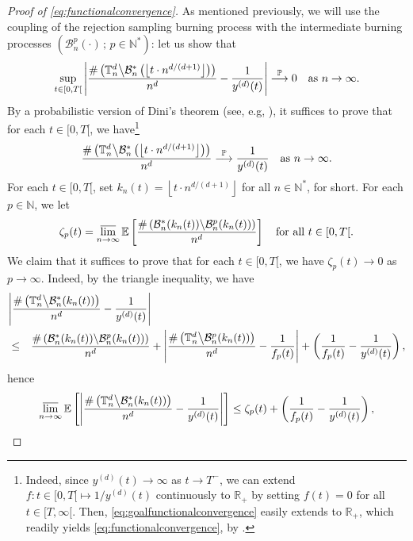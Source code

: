 \documentclass[a4paper,11pt]{article}
\begin{document}
\begin{proof}[Proof of \eqref{eq:functionalconvergence}]
As mentioned previously, we will use the coupling of the rejection sampling burning process with the intermediate burning processes $\left(\mathcal{B}_n^p(\cdot)\,;\,p\in\mathbb{N}^*\right)$: let us show that
\[\sup_{t\in[0,T[}\left|\frac{\#\left(\mathbb{T}_n^d\middle\backslash\mathcal{B}_n^*\left(\left\lfloor t\cdot n^{d/(d+1)}\right\rfloor\right)\right)}{n^d}-\frac{1}{y^{(d)}(t)}\right|\overset{\mathbb{P}}{\longrightarrow}0\quad\text{as $n\to\infty$.}\]
By a probabilistic version of Dini's theorem (see, e.g, \cite[Lemma 11.6]{chef}), it suffices to prove that for each $t\in[0,T[$, we have\footnote{Indeed, since $y^{(d)}(t)\rightarrow\infty$ as $t\to T^-$, we can extend $f:t\in{[0,T[}\mapsto1/y^{(d)}(t)$ continuously to $\mathbb{R}_+$ by setting $f(t)=0$ for all $t\in[T,\infty[$.
Then, \eqref{eq:goalfunctionalconvergence} easily extends to $\mathbb{R}_+$, which readily yields \eqref{eq:functionalconvergence}, by \cite[Lemma 11.6]{chef}.}
\begin{equation}\label{eq:goalfunctionalconvergence}
\frac{\#\left(\mathbb{T}_n^d\middle\backslash\mathcal{B}_n^*\left(\left\lfloor t\cdot n^{d/(d+1)}\right\rfloor\right)\right)}{n^d}\overset{\mathbb{P}}{\longrightarrow}\frac{1}{y^{(d)}(t)}\quad\text{as $n\to\infty$.}
\end{equation}
For each $t\in[0,T[$, set $k_n(t)=\left\lfloor t\cdot n^{d/(d+1)}\right\rfloor$ for all $n\in\mathbb{N}^*$, for short.
For each $p\in\mathbb{N}$, we let
\[\zeta_p(t)=\varlimsup_{n\to\infty}\mathbb{E}\left[\frac{\#\left(\mathcal{B}_n^*(k_n(t))\middle\backslash\mathcal{B}_n^p(k_n(t))\right)}{n^d}\right]\quad\text{for all $t\in[0,T[$.}\]
We claim that it suffices to prove that for each $t\in[0,T[$, we have $\zeta_p(t)\rightarrow0$ as $p\to\infty$.
Indeed, by the triangle inequality, we have
\begin{eqnarray*}
\lefteqn{\left|\frac{\#\left(\mathbb{T}_n^d\middle\backslash\mathcal{B}_n^*(k_n(t))\right)}{n^d}-\frac{1}{y^{(d)}(t)}\right|}\\
&\leq&\frac{\#\left(\mathcal{B}_n^*(k_n(t))\middle\backslash\mathcal{B}_n^p(k_n(t))\right)}{n^d}+\left|\frac{\#\left(\mathbb{T}_n^d\middle\backslash\mathcal{B}_n^p(k_n(t))\right)}{n^d}-\frac{1}{f_p(t)}\right|+\left(\frac{1}{f_p(t)}-\frac{1}{y^{(d)}(t)}\right),
\end{eqnarray*}
hence
\[\varlimsup_{n\to\infty}\mathbb{E}\left[\left|\frac{\#\left(\mathbb{T}_n^d\middle\backslash\mathcal{B}_n^*(k_n(t))\right)}{n^d}-\frac{1}{y^{(d)}(t)}\right|\right]\leq\zeta_p(t)+\left(\frac{1}{f_p(t)}-\frac{1}{y^{(d)}(t)}\right),\]

\end{proof}
\end{document}
